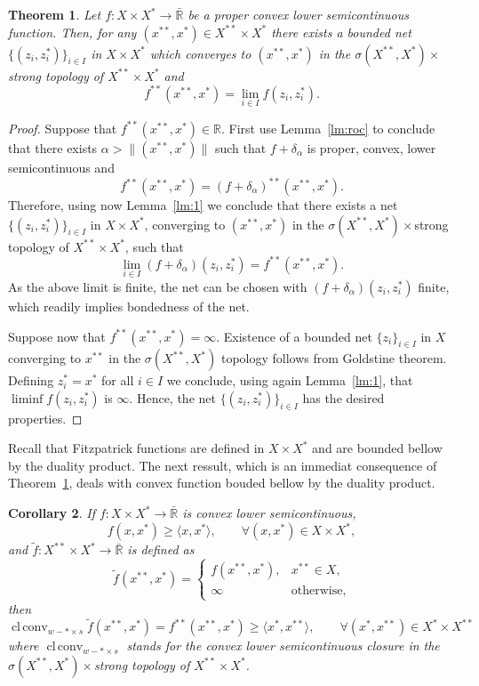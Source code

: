 \documentclass[11pt]{article}
\newcommand{\R}{\mathbb{R}}
\newcommand{\BR}{\bar{\mathbb{R}}}
\DeclareMathOperator{\clconv}{cl\,conv}
\newcommand{\inner}[2]{\langle{#1},{#2}\rangle}
\newcommand{\norm}[1]{\|#1\|}
\newtheorem{theorem}{Theorem}[section]
\newtheorem{corollary}[theorem]{Corollary}
\begin{document}
\begin{theorem}\label{th:a}
  Let $f:X\times X^*\to\BR$ be a proper convex lower semicontinuous
  function. Then, for any $(x^{**},x^*)\in X^{**}\times X^{*}$ there
  exists a bounded net $\{(z_i,z^*_i)\}_{i\in I}$ in $X\times X^*$ which 
  converges to $(x^{**},x^*)$ in the
  $\sigma(X^{**},X^*)\times$strong topology of $X^{**}\times X^*$ and
   \[ f^{**}(x^{**},x^*)=\lim_{i\in I} f(z_i,z_i^*).\]
\end{theorem}
\begin{proof}
  Suppose that $f^{**}(x^{**},x^*)\in\R$.  First use Lemma~\ref{lm:roc} to conclude
  that there exists $\alpha>\norm{(x^{**},x^*)}$ such that
  $f+\delta_\alpha$ is proper, convex,
  lower semicontinuous and
\[  f^{**}(x^{**},x^*)=(f+\delta_\alpha)^{**}(x^{**},x^*).
\]
Therefore, using now Lemma~\ref{lm:1} we conclude that there exists
a net $\{(z_i,z^*_i)\}_{i\in I}$ in $X\times X^*$, converging to
$(x^{**},x^*)$ in the $\sigma(X^{**},X^*)\times$strong topology of
$X^{**}\times X^*$, such that
\[
\lim_{i\in I}(f+\delta_\alpha)(z_i,z^*_i)= f^{**}(x^{**},x^*).
\]
As the above limit is finite, the net can be chosen with
$(f+\delta_\alpha)(z_i,z^*_i)$ finite, which readily implies bondedness of
the net.

Suppose now that  $f^{**}(x^{**},x^*)=\infty$.
Existence of a bounded net $\{z_i\}_{i\in I}$ in $X$ converging to
$x^{**}$ in the $\sigma(X^{**},X^*)$ topology
follows from Goldstine theorem. 
Defining $z^*_i=x^*$ for all $i\in I$ we conclude,
%
using again Lemma~\ref{lm:1}, that $\liminf f(z_i,z_i^*)$ is
$\infty$. Hence, the net $\{(z_i,z_i^*)\}_{i\in I}$ has the desired properties.
\end{proof}
Recall that Fitzpatrick functions are defined in $X\times X^*$ and are
bounded bellow by the duality product. The next ressult, which is an
immediat consequence of Theorem~\ref{th:a}, deals with convex function
bouded bellow by the duality product.
\begin{corollary}
  \label{cr}
  If $f:X\times X^*\to\BR$ is convex lower semicontinuous,
  \[
   f(x,x^*)\geq \inner{x}{x^*}, \qquad \forall (x,x^*)\in X\times
  X^{*},
  \]
  and $\tilde f:X^{**}\times X^*\to \BR$ is defined as
  \[
  \tilde f(x^{**},x^*)=
  \begin{cases}
    f(x^{**},x^*),& x^{**}\in X,\\
    \infty &\mbox{otherwise},
  \end{cases}
  \]
  then
  \begin{equation}
    \label{eq:xxx}
        \clconv_{w-* \times s} \tilde
  f(x^{**},x^*)= f^{**}(x^{**},x^*)\geq \inner{x^*}{x^{**}}, \qquad \forall
   (x^*,x^{**})
   \in X^*\times
  X^{**}
 \end{equation}
  where $\clconv_{w-*\times s}$ stands for the convex lower
  semicontinuous closure in the $\sigma(X^{**},X^*)\times$strong
  topology of $X^{**}\times X^*$.
\end{corollary}
\end{document}
